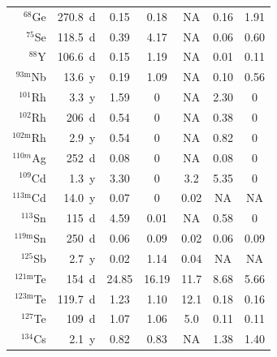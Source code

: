 \begin{table}[!t]
\begin{tabular}{>{\footnotesize}r |>{\footnotesize} r |>{\footnotesize} c |>{\footnotesize} c |>{\footnotesize} c |>{\footnotesize} c |>{\footnotesize} c}
$^{68}$Ge 	      	& 270.8~d		& 0.15	& 0.18	& NA		& 0.16 	& 1.91 \\
$^{75}$Se 	      	& 118.5~d		& 0.39 	& 4.17	& NA		& 0.06 	& 0.60 \\
$^{88}$Y 	      		& 106.6~d		& 0.15 	& 1.19	& NA		& 0.01 	& 0.11 \\
$^{93\mathrm{m}}$Nb 	      	& 13.6~y		& 0.19 	& 1.09	& NA		& 0.10 	& 0.56 \\
$^{101}$Rh 	      	& 3.3~y		& 1.59 	& 0		& NA		& 2.30 	& 0 \\
$^{102}$Rh 	      	& 206~d		& 0.54 	& 0		& NA		& 0.38 	& 0 \\
$^{102\mathrm{m}}$Rh 	      	& 2.9~y		& 0.54 	& 0		& NA		& 0.82 	& 0 \\
$^{110m}$Ag 	      	& 252~d		& 0.08 	& 0		& NA		& 0.08 	& 0 \\
$^{109}$Cd 	      	& 1.3~y		& 3.30 	& 0		& 3.2		& 5.35 	& 0 \\
$^{113\mathrm{m}}$Cd 	      	& 14.0~y		& 0.07 	& 0		& 0.02	& NA 	& NA \\
$^{113}$Sn 	      	& 115~d		& 4.59 	& 0.01	& NA		& 0.58 	& 0 \\
$^{119\mathrm{m}}$Sn 	      	& 250~d		& 0.06 	& 0.09	& 0.02	& 0.06 	& 0.09 \\
$^{125}$Sb 	      	& 2.7~y		& 0.02 	& 1.14	& 0.04	& NA 	& NA \\
$^{121\mathrm{m}}$Te 	      	& 154~d		& 24.85 	& 16.19	& 11.7	& 8.68 	& 5.66 \\
$^{123\mathrm{m}}$Te 	      	& 119.7~d		& 1.23 	& 1.10	& 12.1	& 0.18 	& 0.16 \\
$^{127}$Te 	      	& 109~d		& 1.07 	& 1.06	& 5.0 	& 0.11 	& 0.11 \\
$^{134}$Cs 	      	& 2.1~y		& 0.82 	& 0.83	& NA		& 1.38 	& 1.40 \\
\hline
\end{tabular}
\end{table}

